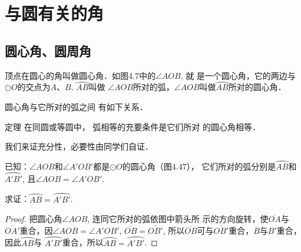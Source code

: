 \section{与圆有关的角}
\subsection{圆心角、圆周角}
顶点在圆心的角叫做圆心角．如图4.7中的$\angle AOB$, 就
是一个圆心角，它的两边与$\odot O$的交点为$A$、$B$. $\wideparen{AB}$叫做
$\angle AOB$所对的弧，$\angle AOB$叫做$\wideparen{AB}$所对的圆心角．

圆心角与它所对的弧之间
有如下关系．

\begin{blk}
    {定理} 在同圆或等圆中，
弧相等的充要条件是它们所对
的圆心角相等．
\end{blk}

我们来证充分性，必要性由同学们自证．

已知：$\angle AOB$和$\angle A'OB'$都是$\odot O$的圆心角（图4.47），
它们所对的弧分别是$\wideparen{AB}$和$\wideparen{A'B'}$, 且$\angle AOB=\angle A'OB'$.

求证：$\wideparen{AB}=\wideparen{A'B'}$.

\begin{proof}
    把圆心角$\angle AOB$, 连同它所对的弧依图中箭头所
示的方向旋转，使$\overline{OA}$与$\overline{OA'}$重合，因$\angle AOB=\angle A'OB'$, 
$\overline{OB}=\overline{OB'}$, 所以$\overline{OB}$可与$\overline{OB'}$重合，$B$与$B'$重合，因此$\wideparen{AB}$与
$\wideparen{A'B'}$重合，所以$\wideparen{AB}=\wideparen{A'B'}$. 
\end{proof}


\begin{figure}[htp]\centering
    \begin{minipage}[t]{0.48\textwidth}
    \centering
    \caption{}
    \end{minipage}
    \begin{minipage}[t]{0.48\textwidth}
    \centering
    \caption{}
    \end{minipage}
    \end{figure}


